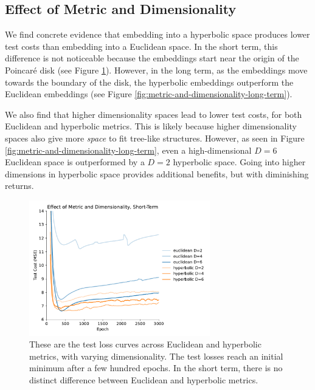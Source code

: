 \documentclass{article}
\begin{document}
\subsection{Effect of Metric and Dimensionality}

We find concrete evidence that embedding into a hyperbolic space produces lower test costs than embedding into a Euclidean space. In the short term, this difference is not noticeable because the embeddings start near the origin of the Poincaré disk (see Figure \ref{fig:metric-and-dimensionality-short-term}). However, in the long term, as the embeddings move towards the boundary of the disk, the hyperbolic embeddings outperform the Euclidean embeddings (see Figure \ref{fig:metric-and-dimensionality-long-term}).

We also find that higher dimensionality spaces lead to lower test costs, for both Euclidean and hyperbolic metrics. This is likely because higher dimensionality spaces also give more \emph{space} to fit tree-like structures. However, as seen in Figure \ref{fig:metric-and-dimensionality-long-term}, even a high-dimensional $D=6$ Euclidean space is outperformed by a $D=2$ hyperbolic space. Going into higher dimensions in hyperbolic space provides additional benefits, but with diminishing returns.

\begin{figure}[ht]
  \centering
  \includegraphics[width=0.7\textwidth]{figures/metric_and_dimensionality_short_term.pdf}
  \caption{These are the test loss curves across Euclidean and hyperbolic metrics, with varying dimensionality. The test losses reach an initial minimum after a few hundred epochs. In the short term, there is no distinct difference between Euclidean and hyperbolic metrics.}
  \label{fig:metric-and-dimensionality-short-term}
\end{figure}
\end{document}
